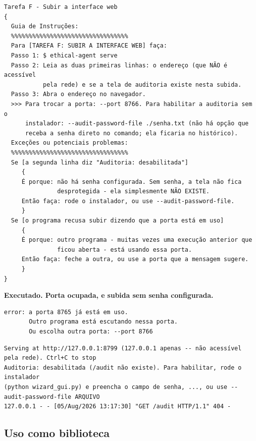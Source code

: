 \documentclass[10pt]{article}
\begin{document}
\begin{lstlisting}
Tarefa F - Subir a interface web
{
  Guia de Instruções:
  %%%%%%%%%%%%%%%%%%%%%%%%%%%%%%%%%
  Para [TAREFA F: SUBIR A INTERFACE WEB] faça:
  Passo 1: $ ethical-agent serve
  Passo 2: Leia as duas primeiras linhas: o endereço (que NÃO é acessível
           pela rede) e se a tela de auditoria existe nesta subida.
  Passo 3: Abra o endereço no navegador.
  >>> Para trocar a porta: --port 8766. Para habilitar a auditoria sem o
      instalador: --audit-password-file ./senha.txt (não há opção que
      receba a senha direto no comando; ela ficaria no histórico).
  Exceções ou potenciais problemas:
  %%%%%%%%%%%%%%%%%%%%%%%%%%%%%%%%%
  Se [a segunda linha diz "Auditoria: desabilitada"]
     {
     É porque: não há senha configurada. Sem senha, a tela não fica
               desprotegida - ela simplesmente NÃO EXISTE.
     Então faça: rode o instalador, ou use --audit-password-file.
     }
  Se [o programa recusa subir dizendo que a porta está em uso]
     {
     É porque: outro programa - muitas vezes uma execução anterior que
               ficou aberta - está usando essa porta.
     Então faça: feche a outra, ou use a porta que a mensagem sugere.
     }
}
\end{lstlisting}

\textbf{Executado. Porta ocupada, e subida sem senha configurada.}

\begin{lstlisting}
error: a porta 8765 já está em uso.
       Outro programa está escutando nessa porta.
       Ou escolha outra porta: --port 8766
\end{lstlisting}

\begin{lstlisting}
Serving at http://127.0.0.1:8799 (127.0.0.1 apenas -- não acessível pela rede). Ctrl+C to stop
Auditoria: desabilitada (/audit não existe). Para habilitar, rode o instalador
(python wizard_gui.py) e preencha o campo de senha, ..., ou use --audit-password-file ARQUIVO
127.0.0.1 - - [05/Aug/2026 13:17:30] "GET /audit HTTP/1.1" 404 -
\end{lstlisting}

\subsection{Uso como biblioteca}
\end{document}
